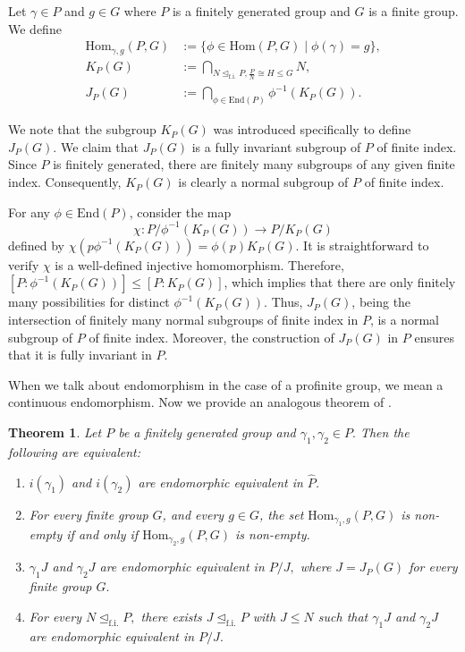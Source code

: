 \documentclass[12pt]{amsart}
\newtheorem{theorem}{Theorem}[section]
\begin{document}
Let $\gamma \in P$ and $g \in G$ where $P$ is a finitely generated group and $G$ is a finite group. We define 
\begin{align*}
   \mathrm{Hom}_{\gamma,g}(P,G) &:= \{ \phi \in \mathrm{Hom}(P,G) \mid \phi(\gamma) = g \}, \\
    K_P(G) &:= \bigcap_{N \unlhd_{\mathrm{f.i.}} P, \frac{P}{N} \cong H \leq G} N, \\
    J_P(G) &:= \bigcap_{\phi \in \mathrm{End}(P)} \phi^{-1}(K_P(G)).
\end{align*}

We note that the subgroup $K_P(G)$ was introduced specifically to define $J_P(G)$.
We claim that $J_P(G)$ is a fully invariant subgroup of $P$ of finite index. Since $P$ is finitely generated, there are finitely many subgroups of any given finite index. Consequently, $K_P(G)$ is clearly a normal subgroup of $P$ of finite index. 

For any $\phi \in \mathrm{End}(P)$, consider the map 
$$\chi : P / \phi^{-1}(K_P(G)) \longrightarrow P / K_P(G)$$ 
defined by $\chi(p\phi^{-1}(K_P(G))) = \phi(p)K_P(G).$ It is straightforward to verify $\chi$ is a well-defined injective homomorphism. Therefore, $[P:  \phi^{-1}(K_P(G))] \leq [P : K_P(G)]$, which implies that there are only finitely many possibilities for distinct $\phi^{-1}(K_P(G))$. Thus, $J_P(G)$, being the intersection of finitely many normal subgroups of finite index in $P$, is a normal subgroup of $P$ of finite index. Moreover, the construction of $J_P(G)$ in $P$ ensures that it is fully invariant in $P$. 


When we talk about endomorphism in the case of a profinite group, we mean a continuous endomorphism. Now we provide an analogous theorem of \cite[Theorem~2.2]{hanany2020some}.
\begin{theorem}\label{main}
    Let $P$ be a finitely generated group and $\gamma_1, \gamma_2 \in P.$ Then the following are equivalent:
    \begin{enumerate}
        \item $i(\gamma_1)$ and $i(\gamma_2)$ are endomorphic equivalent  in $\widehat{P}$.
        \item For every finite group $G$, and every $g \in G$, the set $\mathrm{Hom}_{\gamma_1,g}(P,G)$ is non-empty if and only if $\mathrm{Hom}_{\gamma_2,g}( P,G)$ is non-empty.
        \item $\gamma_1J$ and $\gamma_2J$ are endomorphic equivalent in $P/J,$ where $J= J_P(G)$ for every finite group $G.$
        \item For every $N \unlhd _\mathrm{f.i.}P,$ there exists $J \unlhd_\mathrm{f.i.} P$ with $J \leq N$ such that $\gamma_1J$ and $ \gamma_2J$ are endomorphic equivalent in $P/J.$
    \end{enumerate}
\end{theorem}
\end{document}
